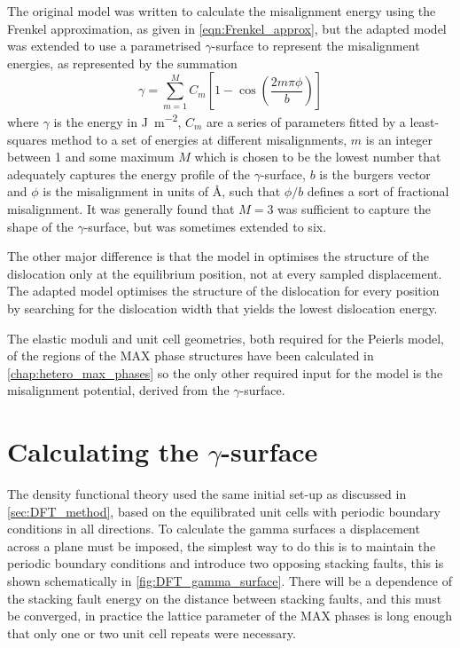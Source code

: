 The original model was written to calculate the misalignment energy using the Frenkel approximation, as given in \autoref{eqn:Frenkel_approx}, but the adapted model was extended to use a parametrised $\gamma$-surface to represent the misalignment energies, as represented by the summation
\begin{equation}
\gamma = \sum_{m=1}^{M} C_m \left[ 1 - \cos \left( \frac{2m\pi \phi}{b} \right) \right]\label{eqn:gamma_surface}
\end{equation}
where $\gamma$ is the energy in \si{\joule\per\meter\squared}, $C_m$ are a series of parameters fitted by a least-squares method to a set of energies at different misalignments, $m$ is an integer between 1 and some maximum $M$ which is chosen to be the lowest number that adequately captures the energy profile of the $\gamma$-surface, $b$ is the burgers vector and $\phi$ is the misalignment in units of \si{\angstrom}, such that $\phi/b$ defines a sort of fractional misalignment. It was generally found that $M=3$ was sufficient to capture the shape of the $\gamma$-surface, but was sometimes extended to six.

The other major difference is that the model in \cite{Clegg2006} optimises the structure of the dislocation only at the equilibrium position, not at every sampled displacement. The adapted model optimises the structure of the dislocation for every position by searching for the dislocation width that yields the lowest dislocation energy.


The elastic moduli and unit cell geometries, both required for the Peierls model, of the regions of the MAX phase structures have been calculated in \autoref{chap:hetero_max_phases} so the only other required input for the model is the misalignment potential, derived from the $\gamma$-surface.

\section{Calculating the \texorpdfstring{$\gamma$}{gamma}-surface}


The density functional theory used the same initial set-up as discussed in \autoref{sec:DFT_method}, based on the equilibrated unit cells with periodic boundary conditions in all directions. To calculate the gamma surfaces a displacement across a plane must be imposed, the simplest way to do this is to maintain the periodic boundary conditions and introduce two opposing stacking faults, this is shown schematically in \autoref{fig:DFT_gamma_surface}. There will be a dependence of the stacking fault energy on the distance between stacking faults, and this must be converged, in practice the lattice parameter of the MAX phases is long enough that only one or two unit cell repeats were necessary.

